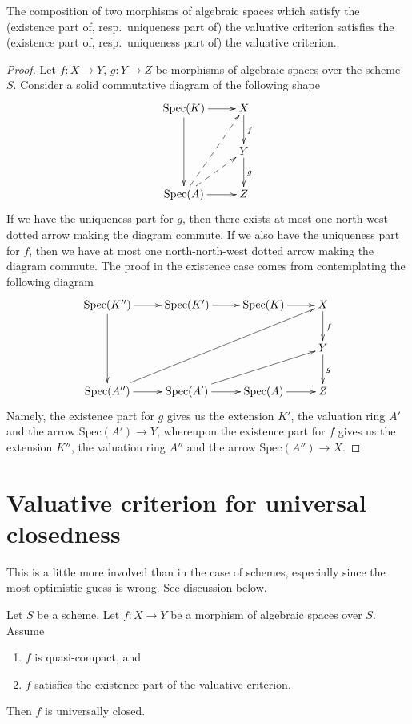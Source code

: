 \begin{lemma}
\label{lemma-composition-valuative-criteria}
The composition of two morphisms of algebraic spaces which satisfy the
(existence part of, resp.\ uniqueness part of) the valuative criterion
satisfies the (existence part of, resp.\ uniqueness part of) the valuative
criterion.
\end{lemma}

\begin{proof}
Let $f : X \to Y$, $g : Y \to Z$ be morphisms of algebraic spaces over the
scheme $S$. Consider a solid commutative diagram of the following shape
$$
\xymatrix{
\text{Spec}(K) \ar[dd] \ar[r] & X \ar[d]^f \\
& Y \ar[d]^g \\
\text{Spec}(A) \ar[r] \ar@{-->}[ru] \ar@{-->}[ruu] & Z
}
$$
If we have the uniqueness part for $g$, then there exists at
most one north-west dotted arrow making the diagram commute.
If we also have the uniqueness part for $f$, then we have
at most one north-north-west dotted arrow making the diagram
commute. The proof in the existence case comes from contemplating
the following diagram
$$
\xymatrix{
\text{Spec}(K'') \ar[r] \ar[dd] &
\text{Spec}(K') \ar[r] &
\text{Spec}(K) \ar[r] &
X \ar[d]^f \\
& & & Y \ar[d]^g \\
\text{Spec}(A'') \ar[r] \ar[rrruu] &
\text{Spec}(A') \ar[r] \ar[rru] &
\text{Spec}(A) \ar[r] &
Z
}
$$
Namely, the existence part for $g$ gives us the extension $K'$, the
valuation ring $A'$ and the arrow $\text{Spec}(A') \to Y$, whereupon
the existence part for $f$ gives us the extension $K''$, the
valuation ring $A''$ and the arrow $\text{Spec}(A'') \to X$.
\end{proof}






\section{Valuative criterion for universal closedness}
\label{section-valuative-criterion-universally-closed}

\noindent
This is a little more involved than in the case of schemes, especially
since the most optimistic guess is wrong. See discussion below.

\begin{lemma}
\label{lemma-quasi-compact-existence-universally-closed}
Let $S$ be a scheme.
Let $f : X \to Y$ be a morphism of algebraic spaces over $S$.
Assume
\begin{enumerate}
\item $f$ is quasi-compact, and
\item $f$ satisfies the existence part of the valuative criterion.
\end{enumerate}
Then $f$ is universally closed.
\end{lemma}

